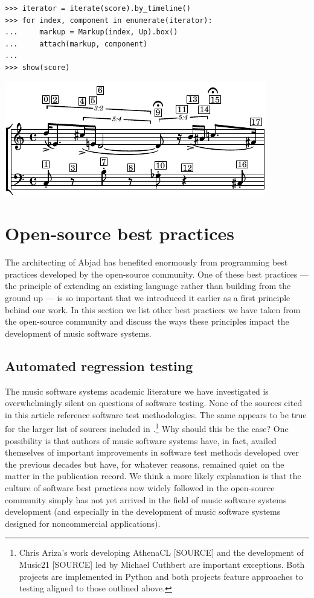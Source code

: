 \documentclass{article}
\begin{document}
\begin{lstlisting}
>>> iterator = iterate(score).by_timeline()
>>> for index, component in enumerate(iterator):
...     markup = Markup(index, Up).box()
...     attach(markup, component)
...
>>> show(score)
\end{lstlisting}
\includegraphics{assets/lilypond-3eefc169b782de95b400a81c4546bdd6.pdf}

\section{Open-source best practices} \label{sec:open-source}

The architecting of Abjad has benefited enormously from programming best
practices developed by the open-source community. One of these best practices
--- the principle of extending an existing language rather than building from
the ground up --- is so important that we introduced it earlier as a first
principle behind our work. In this section we list other best practices we have
taken from the open-source community and discuss the ways these principles
impact the development of music software systems.

\subsection{Automated regression testing}

The music software systems academic literature we have investigated is
overwhelmingly silent on questions of software testing. None of the sources
cited in this article reference software test methodologies. The same appears
to be true for the larger list of sources included in
\cite{trevino2013compositional}.\footnote{Chris Ariza's work developing
AthenaCL [SOURCE] and the development of Music21 [SOURCE] led by Michael
Cuthbert are important exceptions. Both projects are implemented in Python and
both projects feature approaches to testing aligned to those outlined above.}
Why should this be the case? One possibility is that authors of music software
systems have, in fact, availed themselves of important improvements in software
test methods developed over the previous decades but have, for whatever
reasons, remained quiet on the matter in the publication record. We think a
more likely explanation is that the culture of software best practices now
widely followed in the open-source community simply has not yet arrived in the
field of music software systems development (and especially in the development
of music software systems designed for noncommercial applications).
\end{document}
